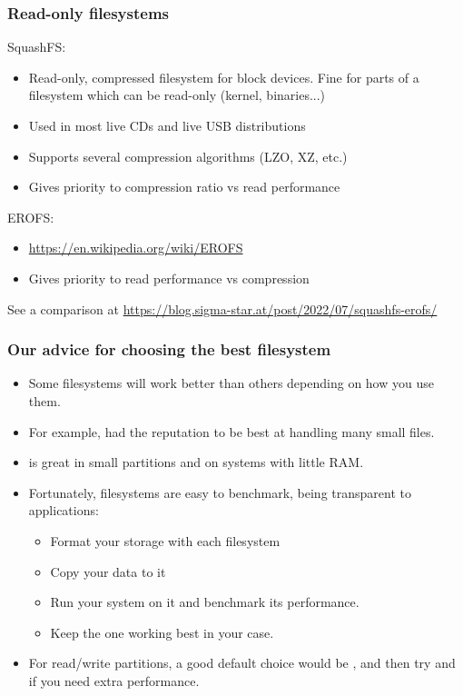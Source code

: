\begin{frame}
  \frametitle{Read-only filesystems}
  SquashFS: 
  \begin{itemize}
  \item Read-only, compressed filesystem for block devices. Fine for
    parts of a filesystem which can be read-only (kernel, binaries...)
  \item Used in most live CDs and live USB distributions
  \item Supports several compression algorithms (LZO, XZ, etc.)
  \item Gives priority to compression ratio vs read performance
  \end{itemize}
  EROFS: 
  \begin{itemize}
     \item \url{https://en.wikipedia.org/wiki/EROFS}
     \item Gives priority to read performance vs compression
  \end{itemize}
  See a comparison at \url{https://blog.sigma-star.at/post/2022/07/squashfs-erofs/}
\end{frame}

\begin{frame}
  \frametitle{Our advice for choosing the best filesystem}
  \begin{itemize}
     \item Some filesystems will work better than others
           depending on how you use them.
     \item For example,  had the reputation
           to be best at handling many small files.
     \item {} is great in small partitions
	   and on systems with little RAM.
     \item Fortunately, filesystems are easy to benchmark, being
           transparent to applications:
           \begin{itemize}
             \item Format your storage with each filesystem
	     \item Copy your data to it
	     \item Run your system on it and benchmark its
                   performance.
	     \item Keep the one working best in your case.
           \end{itemize}
     \item For read/write partitions, a good default choice
           would be , and then try  and 
           if you need extra performance.
  \end{itemize}
\end{frame}

